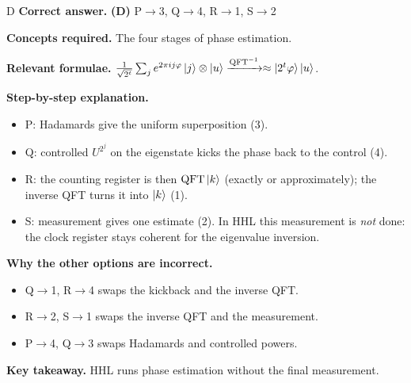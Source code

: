\documentclass[11pt,a4paper]{article}
\newcommand{\qsep}{\par\vspace{2pt}{\color{black!15}\hrule}\vspace{4pt}}
\begin{document}
\begin{solbox}{D}
\textbf{\color{brand}Correct answer.} \textcolor{okgreen}{\textbf{(D)}} P$\to$3, Q$\to$4, R$\to$1, S$\to$2

\textbf{\color{brand}Concepts required.} The four stages of phase estimation.

\textbf{\color{brand}Relevant formulae.} $\frac{1}{\sqrt{2^t}}\sum_j e^{2\pi ij\varphi}\ket j\otimes\ket u \xrightarrow{\mathrm{QFT}^{-1}} \approx\ket{2^t\varphi}\ket u$.

\textbf{\color{brand}Step-by-step explanation.} \begin{itemize}\itemsep0pt
\item P: Hadamards give the uniform superposition (3).
\item Q: controlled $U^{2^j}$ on the eigenstate kicks the phase back to the control (4).
\item R: the counting register is then $\mathrm{QFT}\ket k$ (exactly or approximately); the inverse QFT turns it into $\ket k$ (1).
\item S: measurement gives one estimate (2). In HHL this measurement is \emph{not} done: the clock register stays coherent for the eigenvalue inversion.
\end{itemize}

\textbf{\color{brand}Why the other options are incorrect.}
\begin{itemize}[leftmargin=2.4em, itemsep=1pt, topsep=2pt]
\item[\textbf{(A)}] Q$\to$1, R$\to$4 swaps the kickback and the inverse QFT.
\item[\textbf{(B)}] R$\to$2, S$\to$1 swaps the inverse QFT and the measurement.
\item[\textbf{(C)}] P$\to$4, Q$\to$3 swaps Hadamards and controlled powers.
\end{itemize}
\textbf{\color{brand}Key takeaway.} HHL runs phase estimation without the final measurement.
\end{solbox}
\qsep
\end{document}
